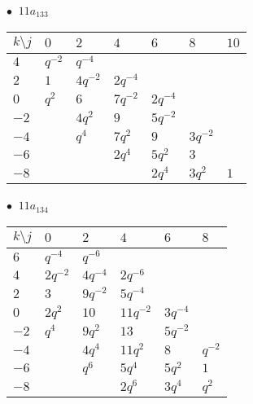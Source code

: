 \begin{minipage}{\linewidth}
$\bullet\ $ $11a_{133}$ \vspace{0.5em} \\
\begin{tabular}{l|llllll}
$k \setminus j$ & $0$ & $2$ & $4$ & $6$ & $8$ & $10$ \\
\hline
$4$ & $q^{-2}$ & $q^{-4}$ &  &  &  &  \\
$2$ & $1$ & $4q^{-2}$ & $2q^{-4}$ &  &  &  \\
$0$ & $q^{2}$ & $6$ & $7q^{-2}$ & $2q^{-4}$ &  &  \\
$-2$ &  & $4q^{2}$ & $9$ & $5q^{-2}$ &  &  \\
$-4$ &  & $q^{4}$ & $7q^{2}$ & $9$ & $3q^{-2}$ &  \\
$-6$ &  &  & $2q^{4}$ & $5q^{2}$ & $3$ &  \\
$-8$ &  &  &  & $2q^{4}$ & $3q^{2}$ & $1$ \\
\end{tabular}
\vspace{2em}
\end{minipage}
%
\begin{minipage}{\linewidth}
$\bullet\ $ $11a_{134}$ \vspace{0.5em} \\
\begin{tabular}{l|lllll}
$k \setminus j$ & $0$ & $2$ & $4$ & $6$ & $8$ \\
\hline
$6$ & $q^{-4}$ & $q^{-6}$ &  &  &  \\
$4$ & $2q^{-2}$ & $4q^{-4}$ & $2q^{-6}$ &  &  \\
$2$ & $3$ & $9q^{-2}$ & $5q^{-4}$ &  &  \\
$0$ & $2q^{2}$ & $10$ & $11q^{-2}$ & $3q^{-4}$ &  \\
$-2$ & $q^{4}$ & $9q^{2}$ & $13$ & $5q^{-2}$ &  \\
$-4$ &  & $4q^{4}$ & $11q^{2}$ & $8$ & $q^{-2}$ \\
$-6$ &  & $q^{6}$ & $5q^{4}$ & $5q^{2}$ & $1$ \\
$-8$ &  &  & $2q^{6}$ & $3q^{4}$ & $q^{2}$ \\
\end{tabular}
\vspace{2em}
\end{minipage}
%
